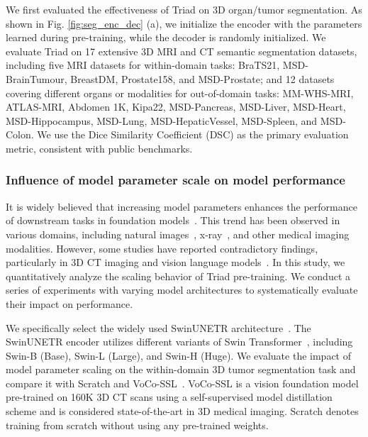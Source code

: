 We first evaluated the effectiveness of Triad on 3D organ/tumor segmentation. As shown in Fig. \ref{fig:seg_enc_dec} (a), we initialize the encoder with the parameters learned during pre-training, while the decoder is randomly initialized.
We evaluate Triad on 17 extensive 3D MRI and CT semantic segmentation datasets, including five MRI datasets for within-domain tasks: BraTS21\citep{baid2021rsna}, MSD\citep{antonelli2022medical}-BrainTumour, BreastDM\citep{zhao2023breastdm}, Prostate158\citep{adams2022prostate158}, and MSD-Prostate; and 12 datasets covering different organs or modalities for out-of-domain tasks: MM-WHS-MRI\citep{zhuang2018multivariate}, ATLAS-MRI\citep{quinton2023tumour}, Abdomen 1K\citep{ma2021abdomenct}, Kipa22\citep{he2021meta}, MSD-Pancreas, MSD-Liver, MSD-Heart, MSD-Hippocampus, MSD-Lung, MSD-HepaticVessel, MSD-Spleen, and MSD-Colon.
We use the Dice Similarity Coefficient (DSC) as the primary evaluation metric, consistent with public benchmarks.

\subsubsection{Influence of model parameter scale on model performance}

It is widely believed that increasing model parameters enhances the performance of downstream tasks in foundation models~\citep{oquab2023dinov2,chen2024towards,ghesu2022contrastive,amadou2024echoapex}. This trend has been observed in various domains, including natural images~\citep{oquab2023dinov2}, x-ray~\citep{ghesu2022contrastive}, and other medical imaging modalities\citep{chen2024towards,amadou2024echoapex}.
However, some studies have reported contradictory findings, particularly in 3D CT imaging\citep{wu2024voco} and vision language models~\citep{shi2025we,mei2024bigger}. In this study, we quantitatively analyze the scaling behavior of Triad pre-training. We conduct a series of experiments with varying model architectures to systematically evaluate their impact on performance.

We specifically select the widely used SwinUNETR architecture~\citep{he2023swinunetr}. The SwinUNETR encoder utilizes different variants of Swin Transformer~\citep{dosovitskiy2020image}, including Swin-B (Base), Swin-L (Large), and Swin-H (Huge).
We evaluate the impact of model parameter scaling on the within-domain 3D tumor segmentation task and compare it with Scratch and VoCo-SSL~\citep{wu2024voco}. VoCo-SSL is a vision foundation model pre-trained on 160K 3D CT scans using a self-supervised model distillation scheme and is considered state-of-the-art in 3D medical imaging. Scratch denotes training from scratch without using any pre-trained weights.

